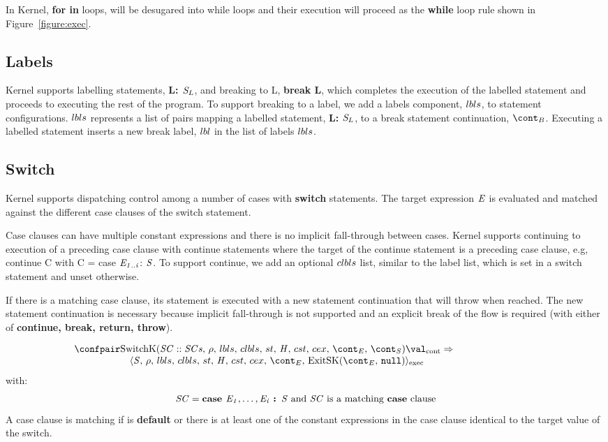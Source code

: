 \documentclass{article}
\begin{document}
In Kernel, \textbf{for in} loops, will be desugared into while loops and their execution will proceed as the \textbf{while} loop rule shown in Figure~\ref{figure:exec}.
\subsection{Labels}

Kernel supports labelling statements, \textbf{L: $\mathit{S}_{L}$}, and breaking to L, \textbf{break L}, which completes the execution of the labelled statement and proceeds to executing the rest of the program.
To support breaking to a label, we add a labels component, $lbls$, to statement configurations.
$lbls$ represents a list of pairs mapping a labelled statement, \textbf{L: $\mathit{S}_L$}, to a break statement continuation, $\bcont$.
Executing a labelled statement inserts a new break label, $lbl$ in the list of labels $lbls$.

\subsection{Switch}
Kernel supports dispatching control among a number of cases with \textbf{switch} statements.
The target expression $\mathit{E}$ is evaluated and matched against the different case clauses of the switch statement.

\noindent
Case clauses can have multiple constant expressions and there is no implicit fall-through between cases.
Kernel supports continuing to execution of a preceding case clause with continue statements where the target of the continue statement is a preceding case clause, e.g, continue C with C = case $\mathit{E}_\mathit{1..i}$: $\mathit{S}$.
To support continue, we add an optional $clbls$ list, similar to the label list, which is set in a switch statement and unset otherwise.

\noindent
If there is a matching case clause, its statement is executed with a new statement continuation that will throw when reached.
The new statement continuation is necessary because implicit fall-through is not supported and an explicit break of the flow is required (with either of \textbf{continue, break, return, throw}).

\[
  \begin{array}{lcl}
	\contconf{\SwitchK{\scase :: \scases}{\clbls}}{\val}
	\Rightarrow \hspace{30mm}\\
	\hspace{20mm}\execconf{\stmt}{\env}{\lbls}{\clbls}{\handler}{\cstrace}{\cex}{\econt}{\ExitSK{\tt{null}}}
  \end{array}
\]
with:
\[
	\mathit{SC} = \textbf{case } \mathit{E}_\mathit{1}, \dots, \mathit{E}_\mathit{i} \textbf{ : } \mathit{S} \textrm{ and } \mathit{SC} \textrm{ is a matching \textbf{case} clause}
\]
A case clause is matching if is \textbf{default} or there is at least one of the constant expressions in the case clause identical to the target value of the switch.
\end{document}
